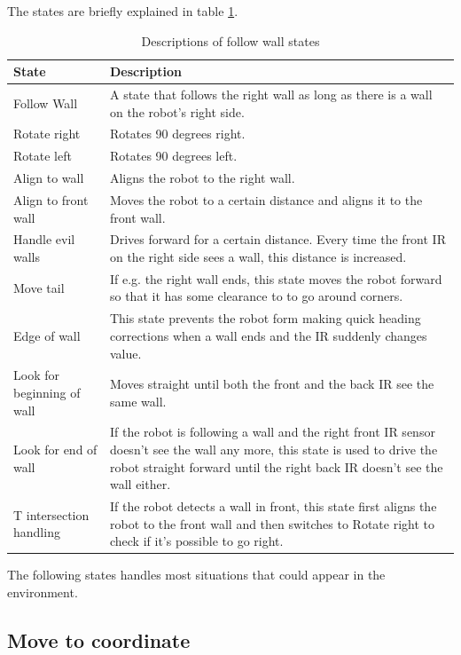The states are briefly explained in table \ref{tab:followWallStates}. 
\begin{table}
\centering
  \caption{Descriptions of follow wall states}
  \begin{tabular}{l|p{10cm}}
    \textbf{State} & \textbf{Description} \\ \hline
    Follow Wall & A state that follows the right wall as long as there is a wall on the robot’s right side. \\ \hline
    Rotate right & Rotates 90 degrees right. \\ \hline
    Rotate left & Rotates 90 degrees left. \\ \hline
    Align to wall & Aligns the robot to the right wall. \\ \hline
    Align to front wall & Moves the robot to a certain distance and aligns it to the front wall. \\ \hline
    Handle evil walls & Drives forward for a certain distance. Every time the front IR on the right side sees a wall, this distance is increased. \\ \hline
    Move tail & If e.g. the right wall ends, this state moves the robot forward so that it has some clearance to to go around corners. \\ \hline
    Edge of wall & This state prevents the robot form making quick heading corrections when a wall ends and the IR suddenly changes value. \\ \hline
    Look for beginning of wall & Moves straight until both the front and the back IR see the same wall.  \\ \hline
    Look for end of wall & If the robot is following a wall and the right front IR sensor doesn’t see the wall any more, this state is used to drive the robot straight forward until the right back IR doesn’t see the wall either. \\ \hline
    T intersection handling & If the robot detects a wall in front, this state first aligns the robot to the front wall and then switches to Rotate right to check if it’s possible to go right. \\ 
    \hline
  \end{tabular}
\normalsize
\label{tab:followWallStates}
\end{table}

The following states handles most situations that could appear in the environment.

\subsection{Move to coordinate}

